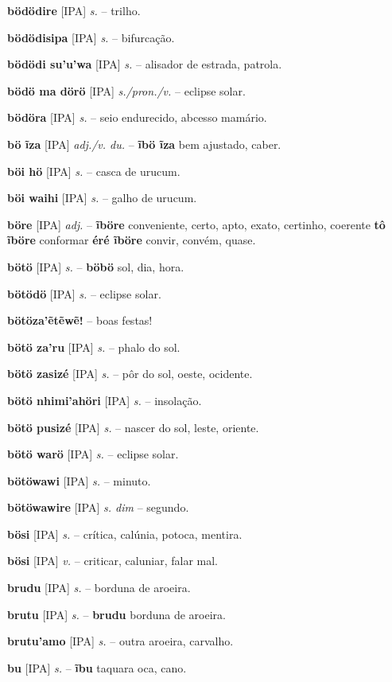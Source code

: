 \textbf{bödödire} [IPA] \textit{s.} -- trilho.

\textbf{bödödisipa} [IPA] \textit{s.} -- bifurcação.

\textbf{bödödi su'u'wa} [IPA] \textit{s.} -- alisador de estrada, patrola.

\textbf{bödö ma dörö} [IPA] \textit{s./pron./v.} -- eclipse solar.

\textbf{bödöra} [IPA] \textit{s.} -- seio endurecido, abcesso mamário.

\textbf{bö ĩza} [IPA] \textit{adj./v. du.} -- \textbf{ĩbö ĩza} bem ajustado, caber.

\textbf{böi hö} [IPA] \textit{s.} -- casca de urucum.

\textbf{böi waihi} [IPA] \textit{s.} -- galho de urucum.

\textbf{böre} [IPA] \textit{adj.} -- \textbf{ĩböre} conveniente, certo, apto, exato, certinho, coerente  \textbf{tô ĩböre} conformar  \textbf{éré ĩböre} convir, convém, quase.

\textbf{bötö} [IPA] \textit{s.} -- \textbf{böbö} sol, dia, hora.

\textbf{bötödö} [IPA] \textit{s.} -- eclipse solar.

\textbf{bötöza'ẽtẽwẽ!} -- boas festas!

\textbf{bötö za'ru} [IPA] \textit{s.} -- phalo do sol.

\textbf{bötö zasizé} [IPA] \textit{s.} -- pôr do sol, oeste, ocidente.

\textbf{bötö nhimi'ahöri} [IPA] \textit{s.} -- insolação.

\textbf{bötö pusizé} [IPA] \textit{s.} -- nascer do sol, leste, oriente.

\textbf{bötö warö} [IPA] \textit{s.} -- eclipse solar.

\textbf{bötöwawi} [IPA] \textit{s.} -- minuto.

\textbf{bötöwawire} [IPA] \textit{s. dim} -- segundo.

\textbf{bösi} [IPA] \textit{s.} -- crítica, calúnia, potoca, mentira.

\textbf{bösi} [IPA] \textit{v.} -- criticar, caluniar, falar mal.

\textbf{brudu} [IPA] \textit{s.} -- borduna de aroeira.

\textbf{brutu} [IPA] \textit{s.} -- \textbf{brudu} borduna de aroeira.

\textbf{brutu'amo} [IPA] \textit{s.} -- outra aroeira, carvalho.

\textbf{bu} [IPA] \textit{s.} -- \textbf{ĩbu} taquara oca, cano.

